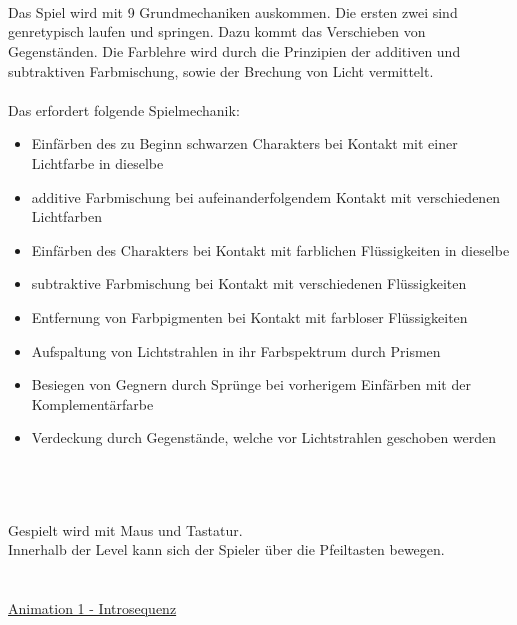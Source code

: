 \documentclass[10pt,a4paper,notitlepage]{report}
\begin{document}
	\clearpage\
	\marginpar{\vspace{3.0mm} \color{orange}\rule{0.8mm}{53.3mm} \\[3mm] \color{hellorange}\rule{0.8mm}{170mm}}
	\\
	\\
	\\
	\Text
		Das Spiel wird mit 9 Grundmechaniken auskommen. Die ersten zwei sind genretypisch laufen und springen. 
	Dazu kommt das Verschieben von Gegenständen. Die Farblehre wird durch die Prinzipien der additiven und subtraktiven Farbmischung, 
	sowie der Brechung von Licht vermittelt.\\
	\\
	Das erfordert folgende Spielmechanik:\\
	\begin{itemize}
	\item Einfärben des zu Beginn schwarzen Charakters bei Kontakt mit einer Lichtfarbe in dieselbe
	\item additive Farbmischung bei aufeinanderfolgendem Kontakt mit verschiedenen Lichtfarben
	\item Einfärben des Charakters bei Kontakt mit farblichen Flüssigkeiten in dieselbe
	\item subtraktive Farbmischung bei Kontakt mit verschiedenen Flüssigkeiten
	\item Entfernung von Farbpigmenten bei Kontakt mit farbloser Flüssigkeiten
	\item Aufspaltung von Lichtstrahlen in ihr Farbspektrum durch Prismen
	\item Besiegen von Gegnern durch Sprünge bei vorherigem Einfärben mit der Komplementärfarbe
	\item Verdeckung durch Gegenstände, welche vor Lichtstrahlen geschoben werden
	\end{itemize}\
	\\
	\\
	\\
	\Text
		Gespielt wird mit Maus und Tastatur.\\
	Innerhalb der Level kann sich der Spieler über die Pfeiltasten bewegen.
	\clearpage\
	\marginpar{\vspace{3.0mm} \color{orange}\rule{0.8mm}{53.3mm} \\[3mm] \color{hellorange}\rule{0.8mm}{170mm}}
	\\
	\
	\\
	\\
	\Text
	\underline{Animation 1 - Introsequenz}\
\end{document}
